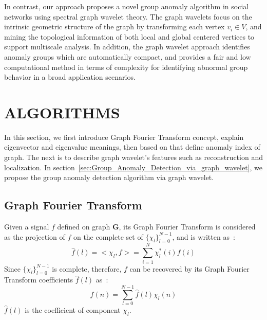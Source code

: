 \documentclass[conference]{IEEEtran}
\begin{document}
In contrast, our approach proposes a novel group anomaly algorithm in social networks using spectral graph wavelet theory.
The graph wavelets focus on the intrinsic geometric structure of the graph by transforming each vertex $v_i\in V$, and mining the topological information of both local and global centered vertices to support multiscale analysis.
In addition, the graph wavelet approach identifies anomaly groups which are automatically compact, and provides a fair and low computational method in terms of complexity for identifying abnormal group behavior in a broad application scenarios.


\section{ALGORITHMS}
\label{sec:algorithm}

In this section, we first introduce Graph Fourier Transform concept, explain eigenvector and eigenvalue meanings, then based on that define anomaly index of graph. The next is to describe graph wavelet's features such as reconstruction and localization. In section~\ref{sec:Group_Anomaly_Detection_via_graph_wavelet}, we propose the group anomaly detection algorithm via graph wavelet.

\subsection{Graph Fourier Transform}
\label{sec:Graph_Fourier_Transform}
Given a signal $f$ defined on graph $\mathbf{G}$, its Graph Fourier Transform is considered as the projection of $f$ on the complete set of $\{\chi_l\}_{l=0}^{N-1}$, and is written as~\cite{hammond2011wavelets}:
\begin{equation}
\label{eq:Graph_Fourier_Transform1}
\hat{f}(l)=<\chi_{l},f>=\sum_{i=1}^{N}\chi^*_{l}(i)f(i)
\end{equation}
Since $\{\chi_l\}_{l=0}^{N-1}$ is complete, therefore, $f$ can be recovered by its Graph Fourier Transform coefficients $\hat{f}(l)$ as~\cite{hammond2011wavelets}:
\begin{equation}
\label{eq:Inverser_Graph_Fourier_Transform}
f(n)=\sum_{l=0}^{N-1}\hat{f}(l)\chi_{l}(n)
\end{equation}
$\hat{f}(l)$ is the coefficient of component $\chi_l$.
\end{document}
